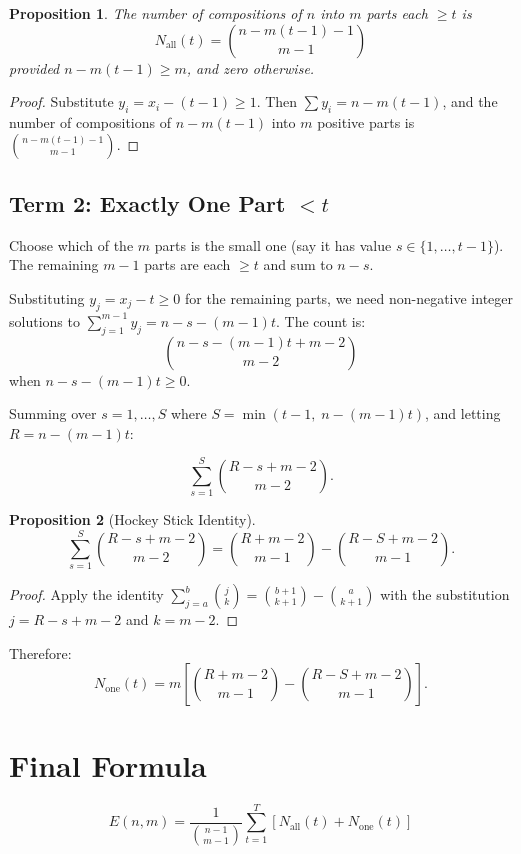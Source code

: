 \documentclass[11pt,a4paper]{article}
\newtheorem{proposition}{Proposition}
\begin{document}
\begin{proposition}
The number of compositions of $n$ into $m$ parts each $\ge t$ is
\[
    N_{\text{all}}(t) = \binom{n - m(t-1) - 1}{m - 1}
\]
provided $n - m(t-1) \ge m$, and zero otherwise.
\end{proposition}

\begin{proof}
Substitute $y_i = x_i - (t-1) \ge 1$. Then $\sum y_i = n - m(t-1)$, and the number of
compositions of $n - m(t-1)$ into $m$ positive parts is $\binom{n - m(t-1) - 1}{m-1}$.
\end{proof}

\subsection{Term 2: Exactly One Part $< t$}

Choose which of the $m$ parts is the small one (say it has value $s \in \{1, \ldots, t-1\}$).
The remaining $m-1$ parts are each $\ge t$ and sum to $n - s$.

Substituting $y_j = x_j - t \ge 0$ for the remaining parts, we need non-negative integer
solutions to $\sum_{j=1}^{m-1} y_j = n - s - (m-1)t$. The count is:
\[
    \binom{n - s - (m-1)t + m - 2}{m - 2}
\]
when $n - s - (m-1)t \ge 0$.

\medskip
Summing over $s = 1, \ldots, S$ where $S = \min(t-1, \; n - (m-1)t)$, and letting
$R = n - (m-1)t$:

\[
    \sum_{s=1}^{S} \binom{R - s + m - 2}{m - 2}.
\]

\begin{proposition}[Hockey Stick Identity]
\[
    \sum_{s=1}^{S} \binom{R - s + m - 2}{m - 2}
    = \binom{R + m - 2}{m - 1} - \binom{R - S + m - 2}{m - 1}.
\]
\end{proposition}

\begin{proof}
Apply the identity $\sum_{j=a}^{b} \binom{j}{k} = \binom{b+1}{k+1} - \binom{a}{k+1}$
with the substitution $j = R - s + m - 2$ and $k = m - 2$.
\end{proof}

Therefore:
\[
    N_{\text{one}}(t) = m \left[\binom{R + m - 2}{m - 1} - \binom{R - S + m - 2}{m - 1}\right].
\]

\section{Final Formula}

\[
    \boxed{E(n, m) = \frac{1}{\binom{n-1}{m-1}} \sum_{t=1}^{T}
    \left[N_{\text{all}}(t) + N_{\text{one}}(t)\right]}
\]
\end{document}
